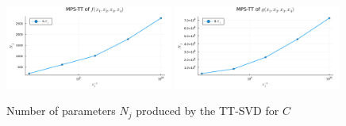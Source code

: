 \documentclass[a4paper]{article}
\begin{document}
\begin{figure}[H]
    \centering
    \includegraphics[width=0.49\textwidth]{./plots/ttsvd-Nj-a.png}
    \includegraphics[width=0.49\textwidth]{./plots/ttsvd-Nj-b.png}
    \caption{Number of parameters $N_j$ produced by the TT-SVD for $C$}
\end{figure}


\nocite{code}
\printbibliography
\end{document}
